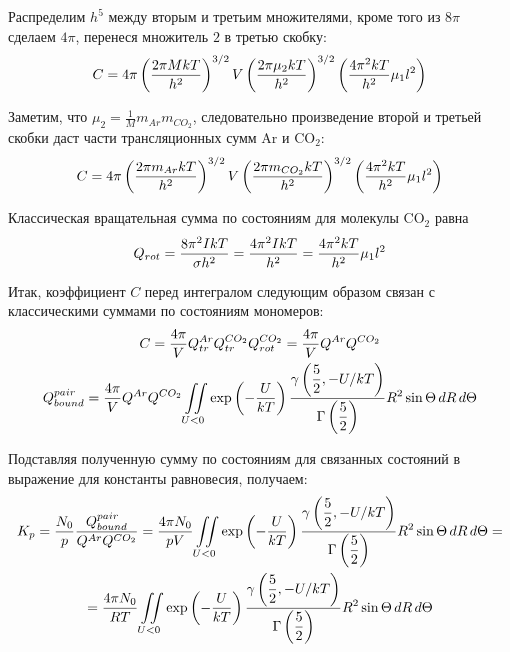 \documentclass[12pt]{article}
\newcommand{\lb}{\left(}
\newcommand{\rb}{\right)}
\begin{document}
Распределим $h^5$ между вторым и третьим множителями, кроме того из $8 \pi$ сделаем $4 \pi$, перенеся множитель $2$ в третью скобку:
\begin{gather}
	C = 4 \pi \lb \frac{2 \pi M k T}{h^2} \rb^{3/2} V \lb \frac{2 \pi \mu_2 k T}{h^2} \rb^{3/2} \lb \frac{4 \pi^2 k T}{h^2} \mu_1 l^2 \rb \notag
\end{gather}

Заметим, что $\mu_2 = \displaystyle \frac{1}{M} m_{Ar} m_{CO_2}$, следовательно произведение второй и третьей скобки даст части трансляционных сумм Ar и CO$_2$:
\begin{gather}
		C = 4 \pi \lb \frac{2 \pi m_{Ar} k T}{h^2} \rb^{3/2} V \lb \frac{2 \pi m_{CO_2} k T}{h^2} \rb^{3/2} \lb \frac{4 \pi^2 k T}{h^2} \mu_1 l^2 \rb \notag
\end{gather}

Классическая вращательная сумма по состояниям для молекулы CO$_2$ равна  
\begin{gather}
	Q_{rot} = \frac{8 \pi^2 I k T}{\sigma h^2} = \frac{4 \pi^2 I k T}{h^2} = \frac{4 \pi^2 k T}{h^2} \mu_1 l^2 \notag
\end{gather}

Итак, коэффициент $C$ перед интегралом следующим образом связан с классическими суммами по состояниям мономеров:
\begin{gather}
	C = \frac{4 \pi}{V} Q_{tr}^{Ar} Q_{tr}^{CO_2} Q_{rot}^{CO_2} = \frac{4 \pi}{V} Q^{Ar} Q^{CO_2} \notag \\
	Q_{bound}^{pair} = \frac{4 \pi}{V} Q^{Ar} Q^{CO_2} \iint\limits_{U < 0} \exp \lb - \frac{U}{k T} \rb \frac{\gamma \lb \displaystyle \frac{5}{2}, -U/kT \rb}{\Gamma \lb \displaystyle \frac{5}{2} \rb} R^2 \sin \Theta \, d R \, d \Theta \notag 
\end{gather}

Подставляя полученную сумму по состояниям для связанных состояний в выражение для константы равновесия, получаем:
\begin{gather}
		K_p = \frac{N_0}{p} \frac{Q_{bound}^{pair}}{Q^{Ar} Q^{CO_2}} = \frac{4 \pi N_0}{p V} \iint\limits_{U < 0} \exp \lb - \frac{U}{k T} \rb \frac{\gamma \lb \displaystyle \frac{5}{2}, -U/kT \rb}{\Gamma \lb \displaystyle \frac{5}{2} \rb} R^2 \sin \Theta \, d R \, d \Theta = \notag \\
		= \frac{4 \pi N_0}{R T} \iint\limits_{U < 0} \exp \lb - \frac{U}{k T} \rb \frac{\gamma \lb \displaystyle \frac{5}{2}, -U/kT \rb}{\Gamma \lb \displaystyle \frac{5}{2} \rb} R^2 \sin \Theta \, d R \, d \Theta \notag  
\end{gather}
\end{document}
